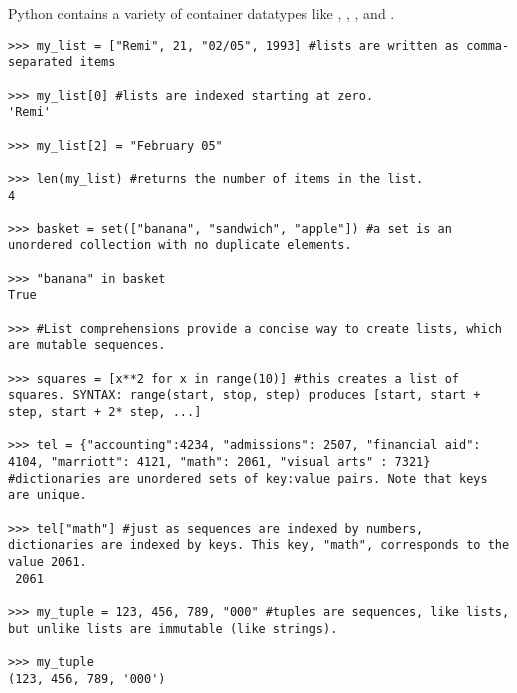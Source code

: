 \begin{example}
Python contains a variety of container datatypes like , , 
, and .

\begin{lstlisting}
>>> my_list = ["Remi", 21, "02/05", 1993] #lists are written as comma-separated items 

>>> my_list[0] #lists are indexed starting at zero.
'Remi'

>>> my_list[2] = "February 05"

>>> len(my_list) #returns the number of items in the list.
4

>>> basket = set(["banana", "sandwich", "apple"]) #a set is an unordered collection with no duplicate elements. 

>>> "banana" in basket
True

>>> #List comprehensions provide a concise way to create lists, which are mutable sequences. 

>>> squares = [x**2 for x in range(10)] #this creates a list of squares. SYNTAX: range(start, stop, step) produces [start, start + step, start + 2* step, ...]

>>> tel = {"accounting":4234, "admissions": 2507, "financial aid": 4104, "marriott": 4121, "math": 2061, "visual arts" : 7321} #dictionaries are unordered sets of key:value pairs. Note that keys are unique.

>>> tel["math"] #just as sequences are indexed by numbers, dictionaries are indexed by keys. This key, "math", corresponds to the value 2061.
 2061

>>> my_tuple = 123, 456, 789, "000" #tuples are sequences, like lists, but unlike lists are immutable (like strings). 

>>> my_tuple
(123, 456, 789, '000')



\end{lstlisting}
\end{example}

